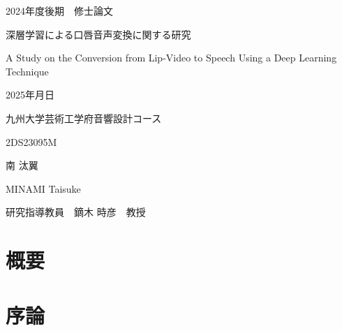 \documentclass[12pt]{jarticle}
\numberwithin{equation}{section}    %
\numberwithin{figure}{section}      %
\numberwithin{table}{section}      %
\begin{document}
\begin{titlepage}
    \begin{center}
        {\Large 2024年度後期　修士論文}
        \vspace{120truept}

        {\huge 深層学習による口唇音声変換に関する研究}
        \vspace{30truept}

        {\huge A Study on the Conversion from Lip-Video to Speech Using a Deep Learning Technique}
        \vspace{120truept}

        {\Large 2025年月日}
        \vspace{10truept}

        {\Large 九州大学芸術工学府音響設計コース}
        \vspace{70truept}

        {\Large 2DS23095M}
        \vspace{10truept}

        {\Large 南 汰翼}
        \vspace{10truept}

        {\Large MINAMI Taisuke}
        \vspace{30truept}

        {\Large 研究指導教員　鏑木 時彦　教授}
    \end{center}
\end{titlepage}

\section*{概要}
\thispagestyle{empty}
\clearpage

\setcounter{tocdepth}{2}
\tableofcontents
\thispagestyle{empty}
\clearpage

\pagestyle{plain}
\setcounter{page}{1}

\section{序論}
\end{document}
